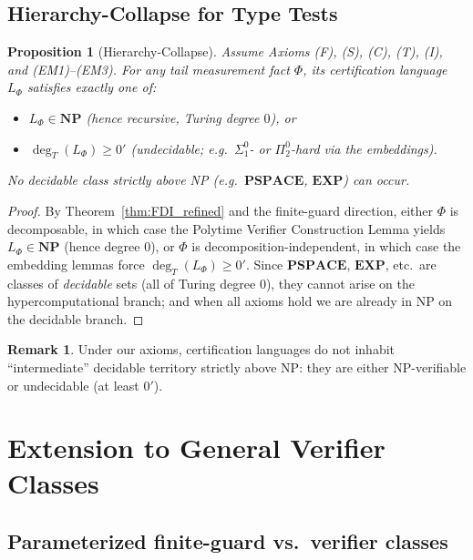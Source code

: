 \documentclass[12pt]{article}
\theoremstyle{definition}
\newtheorem{remark}{Remark}[section]
\theoremstyle{plain}
\newtheorem{proposition}{Proposition}[section]
\begin{document}
\subsection{Hierarchy-Collapse for Type Tests}\label{subsec:hierarchy-collapse}

\begin{proposition}[Hierarchy-Collapse]\label{prop:hierarchy-collapse}
Assume Axioms \textup{(F)}, \textup{(S)}, \textup{(C)}, \textup{(T)}, \textup{(I)}, and \textup{(EM1)}–\textup{(EM3)}. 
For any tail measurement fact $\Phi$, its certification language $L_\Phi$ satisfies exactly one of:
\begin{itemize}[itemsep=2pt]
  \item $L_\Phi\in\mathbf{NP}$ (hence recursive, Turing degree $0$), or
  \item $\deg_T(L_\Phi)\ge 0'$ (undecidable; e.g.\ $\Sigma^0_1$- or $\Pi^0_2$-hard via the embeddings).
\end{itemize}
No decidable class strictly above NP (e.g.\ $\mathbf{PSPACE}$, $\mathbf{EXP}$) can occur.
\end{proposition}

\begin{proof}
By Theorem~\ref{thm:FDI_refined} and the finite-guard direction, either $\Phi$ is decomposable, in which case the Polytime Verifier Construction Lemma yields $L_\Phi\in\mathbf{NP}$ (hence degree $0$), or $\Phi$ is decomposition-independent, in which case the embedding lemmas force $\deg_T(L_\Phi)\ge 0'$. Since $\mathbf{PSPACE}$, $\mathbf{EXP}$, etc.\ are classes of \emph{decidable} sets (all of Turing degree $0$), they cannot arise on the hypercomputational branch; and when all axioms hold we are already in NP on the decidable branch.
\end{proof}

\begin{remark}
Under our axioms, certification languages do not inhabit “intermediate” decidable territory strictly above NP: they are either NP-verifiable or undecidable (at least $0'$). 
\end{remark}


\section{Extension to General Verifier Classes}

\subsection{Parameterized finite-guard vs.\ verifier classes}\label{subsec:extensions-c-v}
\end{document}
